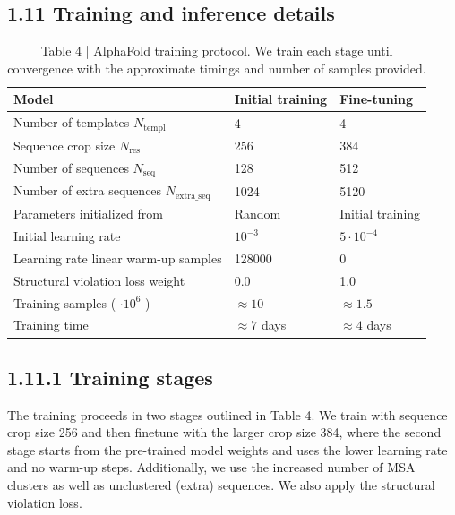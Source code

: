 \documentclass[10pt]{article}
\begin{document}
\subsection*{1.11 Training and inference details}
\begin{table}[h]
\begin{center}
\captionsetup{labelformat=empty}
\caption{Table 4 | AlphaFold training protocol. We train each stage until convergence with the approximate timings and number of samples provided.}
\begin{tabular}{|l|l|l|}
\hline
Model & Initial training & Fine-tuning \\
\hline
Number of templates $N_{\text {templ }}$ & 4 & 4 \\
\hline
Sequence crop size $N_{\text {res }}$ & 256 & 384 \\
\hline
Number of sequences $N_{\text {seq }}$ & 128 & 512 \\
\hline
Number of extra sequences $N_{\text {extra_seq }}$ & 1024 & 5120 \\
\hline
Parameters initialized from & Random & Initial training \\
\hline
Initial learning rate & $10^{-3}$ & $5 \cdot 10^{-4}$ \\
\hline
Learning rate linear warm-up samples & 128000 & 0 \\
\hline
Structural violation loss weight & 0.0 & 1.0 \\
\hline
Training samples ( $\cdot 10^{6}$ ) & $\approx 10$ & $\approx 1.5$ \\
\hline
Training time & $\approx 7$ days & $\approx 4$ days \\
\hline
\end{tabular}
\end{center}
\end{table}

\subsection*{1.11.1 Training stages}
The training proceeds in two stages outlined in Table 4. We train with sequence crop size 256 and then finetune with the larger crop size 384, where the second stage starts from the pre-trained model weights and uses the lower learning rate and no warm-up steps. Additionally, we use the increased number of MSA clusters as well as unclustered (extra) sequences. We also apply the structural violation loss.
\end{document}
